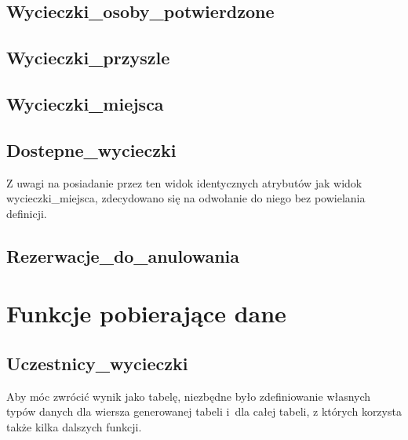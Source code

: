 \documentclass[12pt, a4paper]{mwrep}
\begin{document}
\section{Wycieczki\_osoby\_potwierdzone}



\newpage
\section{Wycieczki\_przyszle}



\section{Wycieczki\_miejsca}



\section{Dostepne\_wycieczki}



Z uwagi na posiadanie przez ten widok identycznych atrybutów jak widok wycieczki\_miejsca, zdecydowano się na odwołanie do niego bez powielania definicji.
\newpage

\section{Rezerwacje\_do\_anulowania}



\chapter{Funkcje pobierające dane}

\section{Uczestnicy\_wycieczki}



Aby móc zwrócić wynik jako tabelę, niezbędne było zdefiniowanie własnych typów danych \ppauza dla wiersza generowanej tabeli i~dla całej tabeli, z których korzysta także kilka dalszych funkcji.
\end{document}
